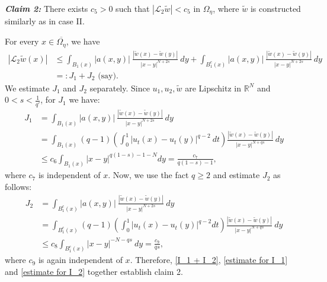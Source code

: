 \documentclass[reqno,oneside]{amsart}
\theoremstyle{definition}
\theoremstyle{remark}
\numberwithin{equation}{section}
\newcommand{\Om} {\Omega}
\newcommand{\sr}{\mathbb{R}}
\begin{document}
\noindent\textbf{\textit{Claim 2:}} There exists $c_5 >0$ such that $\left|\mathcal{L}_2 \tilde{w} \right|< c_5$ in $\Om_{\eta}$, where $\tilde{w}$ is constructed similarly as in case II.
\vspace{5pt}

For every $x\in \overline{\Om_{\eta}}$, we have
\begin{align}\label{I_1 + I_2}
    \left|\mathcal{L}_2 \tilde{w} (x) \right| &\leq \int_{B_1 (x)} |a(x,y)|\ \frac{|\tilde{w} (x) - \tilde{w} (y)|}{|x-y|^{N+2s}}\ dy + \int_{B_1^c (x)} |a(x,y)|\ \frac{|\tilde{w} (x) - \tilde{w} (y)|}{|x-y|^{N+2s}}\ dy \nonumber\\
    &=: J_1 + J_2 \text{ (say)}.
\end{align}
We estimate $J_1$ and $J_2$ separately. Since $u_1, u_2, \tilde{w}$ are Lipschitz in $\sr^N$ and $0< s < \frac{1}{q'}$, for $J_1$ we have:
\begin{align}\label{estimate for I_1}
    J_1 &= \int_{B_1 (x)} |a(x,y)|\ \frac{|\tilde{w} (x) - \tilde{w} (y)|}{|x-y|^{N+2s}}\ dy\nonumber\\
    &= \int_{B_1 (x)} (q-1) \left(\int_0^1 |u_t (x) - u_t (y)|^{q-2}\ dt\right) \frac{|\tilde{w} (x) - \tilde{w} (y)|}{|x-y|^{N+qs}}\ dy\nonumber\\
    &\leq c_6 \int_{B_1 (x)} |x-y|^{q(1-s) -1-N} dy = \frac{c_7}{q(1-s)-1},
\end{align}
where $c_7$ is independent of $x$. Now, we use the fact $q \geq 2$ and estimate $J_2$ as follows:
\begin{align}\label{estimate for I_2}
    J_2 &= \int_{B_1^c (x)} |a(x,y)|\ \frac{|\tilde{w} (x) - \tilde{w} (y)|}{|x-y|^{N+2s}}\ dy\nonumber\\
    &= \int_{B_1^c (x)} (q-1) \left( \int_0^1|u_t (x) - u_t (y)|^{q-2} dt \right) \frac{|\tilde{w} (x) - \tilde{w} (y)|}{|x-y|^{N+qs}}\ dy\nonumber\\
    &\leq c_8 \int_{B_1^c (x)} |x-y|^{-N -qs}\ dy = \frac{c_9}{qs},
\end{align}
where $c_9$ is again independent of $x$. Therefore, \eqref{I_1 + I_2}, \eqref{estimate for I_1} and \eqref{estimate for I_2} together establish claim 2.
\end{document}
